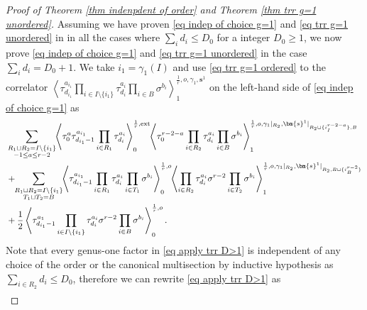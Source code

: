 \documentclass[11pt]{amsart}
\theoremstyle{definition}
\theoremstyle{remark}
\newcommand{\consta}{{\frac{1}{2}}}
\newcommand{\<}{\left<}
\renewcommand{\>}{\right>}
\numberwithin{equation}{section}
\begin{document}
\begin{proof}[Proof of Theorem \ref{thm indenpdent of order} and Theorem \ref{thm trr g=1 unordered}]
    Assuming we have proven \eqref{eq indep of choice g=1} and  \eqref{eq trr g=1 unordered} in in all the cases where $\sum_i d_i\le D_0$ for a integer $D_0\ge 1$,  we now prove \eqref{eq indep of choice g=1} and  \eqref{eq trr g=1 unordered} in the case $\sum_i d_i= D_0+1$. We take $i_1=\gamma_1(I)$ and use \eqref{eq trr g=1 ordered}  to the correlator 
    $\left\langle \tau_{d_{i_1}}^{a_{i_1}}\prod_{i\in I\setminus \{i_1\}}\tau^{a_i}_{d_i}\prod_{i\in B}\sigma^{b_i}\right\rangle^{\frac{1}{r},o,\gamma_1,\bm{s}^1}_1$ on the left-hand side of \eqref{eq indep of choice g=1}  as
    \begin{equation}\label{eq apply trr D>1}
        \begin{split}
    &\sum_{\substack{R_1 \sqcup R_2 = I\setminus\{i_1\}\\ -1\le a \le r-2}}\hspace{-0.1cm}\left\langle \tau_0^{a}\tau_{d_{i_1}-1}^{a_{i_1}}\prod_{i \in R_1}\tau_{d_i}^{a_i}\right\rangle^{\frac{1}{r},\text{ext}}_0
    \hspace{-0.1cm}\left\langle \tau_0^{r-2-a}\prod_{i\in R_2}\tau^{a_i}_{d_i}\prod_{i\in B}\sigma^{b_i}\right\rangle^{\frac{1}{r},o,\gamma_1\vert_{R_2},\bm{s}^1\vert_{R_2\sqcup\{i^{r-2-a}_I\},B}}_1\\
    &+\hspace{-0.1cm}\sum_{\substack{R_1 \sqcup R_2 =  I\setminus\{i_1\} \\ T_1 \sqcup T_2 =  B}} \hspace{-0.1cm} \left\langle \tau^{a_{i_1}}_{d_{i_1}-1}\prod_{i \in R_1} \tau^{a_i}_{d_i}\prod_{i\in T_1}\sigma^{b_i}\right\rangle^{\frac{1}{r},o}_0 \hspace{-0.1cm}\left\langle \prod_{i \in R_2} \tau^{a_i}_{d_i} \sigma^{r-2}\prod_{i\in T_2}\sigma^{b_i}\right\rangle^{\frac{1}{r}, o,\gamma_1\vert_{R_2},\bm{s}^1\vert_{R_2,B\sqcup\{i^{r-2}_B\}}}_1\\
    &+\consta\left\langle \tau_{d_{i_1}-1}^{a_1}\prod_{i\in I\setminus\{i_1\}}\tau^{a_i}_{d_i}\sigma^{r-2}\prod_{i\in B}\sigma^{b_i}\right\rangle^{\frac{1}{r},o}_0.
    \end{split}
    \end{equation}
    Note that every genus-one factor in \eqref{eq apply trr D>1} is independent of any choice of the order or the canonical multisection by inductive hypothesis as $\sum_{i\in R_2}d_i \le D_0$, therefore we can rewrite \eqref{eq apply trr D>1} as 
    \begin{equation}\label{eq apply trr D>1 v1}
        \begin{split}

\end{split}
\end{equation}
\end{proof}
\end{document}
